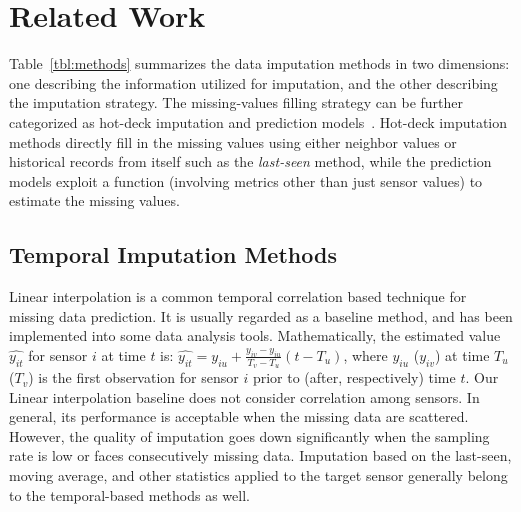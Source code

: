 \section{Related Work}\label{sec:rw}



Table~\ref{tbl:methods} summarizes the data imputation methods in two dimensions: one describing the information utilized for imputation, and the other describing the imputation strategy. The missing-values filling strategy can be further categorized as hot-deck imputation and prediction models~\cite{Garcia:KNNreview}. 
Hot-deck imputation methods directly fill in the missing values using either neighbor values or historical records from itself 
such as the \textit{last-seen} method, while the prediction models exploit a function (involving metrics other than just sensor 
values) to estimate the missing values. 



\subsection{Temporal Imputation Methods}
Linear interpolation is a common temporal correlation based technique for missing data prediction. 
It is usually regarded as a baseline method, and has been implemented into some data analysis tools. Mathematically, the estimated value $\hat{y_{it}}$ for sensor $i$ at time $t$ is:
$\hat{y_{it}} = y_{iu} + \frac{y_{iv}-y_{iu}}{T_v-T_u}(t-T_u)$, where $y_{iu}$ ($y_{iv}$) at time $T_u$ ($T_v$) is the first 
observation for sensor $i$ prior to (after, respectively) time $t$.
Our Linear interpolation baseline does not consider correlation among sensors. In general, its performance is acceptable when the missing data are scattered. 
However, the quality of imputation goes down significantly when the sampling rate is low or faces consecutively missing data. 
Imputation based on the last-seen, moving average, and other statistics applied to the target sensor generally belong to the 
temporal-based methods as well.

